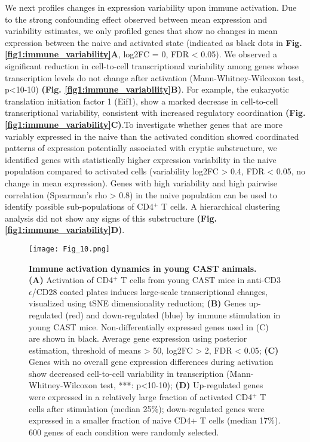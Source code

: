 We next profiles changes in expression variability upon immune activation. Due to the strong confounding effect observed between mean expression and variability estimates, we only profiled genes that show no changes in mean expression between the naive and activated state (indicated as black dots in \textbf{Fig. \ref{fig1:immune_variability}A}, log2FC = 0, FDR < 0.05). We observed a significant reduction in cell-to-cell transcriptional variability among genes whose transcription levels do not change after activation (Mann-Whitney-Wilcoxon test, p<10-10) \textbf{(Fig. \ref{fig1:immune_variability}B)}. For example, the eukaryotic translation initiation factor 1 (Eif1), show a marked decrease in cell-to-cell transcriptional variability, consistent with increased regulatory coordination \textbf{(Fig. \ref{fig1:immune_variability}C)}.To investigate whether genes that are more variably expressed in the naive than the activated condition showed coordinated patterns of expression potentially associated with cryptic substructure, we identified genes with statistically higher expression variability in the naive population compared to activated cells (variability log2FC > 0.4, FDR < 0.05, no change in mean expression). Genes with high variability and high pairwise correlation (Spearman’s rho > 0.8) in the naive population can be used to identify possible sub-populations of CD4$^+$ T cells. A hierarchical clustering analysis did not show any signs of this substructure \textbf{(Fig. \ref{fig1:immune_variability}D)}. 

\begin{figure}[!ht]
\centering
\texttt{[image: Fig\_10.png]}
\caption[Immune activation dynamics in young CAST animals]{\textbf{Immune activation dynamics in young CAST animals.}\\
\textbf{(A)} Activation of CD4$^+$ T cells from young CAST mice in anti-CD3$\epsilon$/CD28 coated plates induces large-scale transcriptional changes, visualized using tSNE dimensionality reduction; \textbf{(B)} Genes up-regulated (red) and down-regulated (blue) by immune stimulation in young CAST mice. Non-differentially expressed genes used in (C) are shown  in black. Average gene expression using posterior estimation, threshold of means > 50, log2FC > 2, FDR < 0.05; \textbf{(C)} Genes with no overall gene expression differences during activation show decreased cell-to-cell variability in transcription (Mann-Whitney-Wilcoxon test, ***: p<10-10); \textbf{(D)} Up-regulated genes were expressed in a relatively large fraction of activated CD4$^+$ T cells after stimulation (median 25\%); down-regulated genes were expressed in a smaller fraction of naive CD4+ T cells (median 17\%). 600 genes of each condition were randomly selected.
}
\label{fig1:immune_activation_CAST}
\end{figure}


